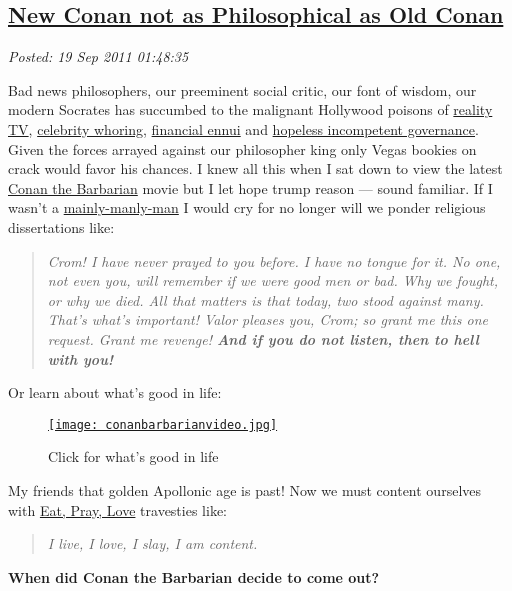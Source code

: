 %

\subsection*{\href{http://bakerjd99.wordpress.com/2011/09/18/new-conan-not-as-philosophical-as-old-conan/}{New Conan not as Philosophical as Old Conan}}


\noindent\emph{Posted: 19 Sep 2011 01:48:35}
\vspace{6pt}

Bad news philosophers, our preeminent social critic, our font of wisdom,
our modern Socrates has succumbed to the malignant Hollywood poisons of
\href{http://www.youjustmademylist.com/?p=562}{reality TV},
\href{http://www.spike.com/articles/0xugni/the-top-10-whore-rific-female-celebrities}{celebrity
whoring},
\href{http://www.bizjournals.com/seattle/blog/2011/09/scant-improvement-in-nations.html}{financial
ennui} and \href{http://www.whitehouse.gov/}{hopeless incompetent
governance}. Given the forces arrayed against our philosopher king only
Vegas bookies on crack would favor his chances. I knew all this when I
sat down to view the latest
\href{http://www.imdb.com/video/screenplay/vi3994852377/}{Conan the
Barbarian} movie but I let hope trump reason --- sound familiar. If I
wasn't a
\href{http://staff.rio.edu/miket/attitude.htm}{mainly-manly-man} I would
cry for no longer will we ponder religious dissertations like:

\begin{quotation}
\emph{Crom! I have never prayed to you before. I have no tongue for it.
No one, not even you, will remember if we were good men or bad. Why we
fought, or why we died. All that matters is that today, two stood
against many. That's what's important! Valor pleases you, Crom; so grant
me this one request. Grant me revenge! \textbf{And if you do not listen,
then to hell with you!}}
\end{quotation}

Or learn about what's good in life:

\captionsetup[figure]{labelformat=empty}
\begin{figure}[htbp]
\centering
\href{http://www.youtube.com/watch?v=6PQ6335puOc}{\texttt{[image: conanbarbarianvideo.jpg]}}
\caption{Click for what's good in life}
\label{fig:conanlife}
\end{figure}


My friends that golden Apollonic age is past! Now we must content
ourselves with
\href{http://bakerjd99.wordpress.com/2010/08/16/binge-pretend-boink/}{Eat,
Pray, Love} travesties like:

\begin{quotation}
\emph{I live, I love, I slay, I am content.}
\end{quotation}

\textbf{When did Conan the Barbarian decide to come out?}

%
